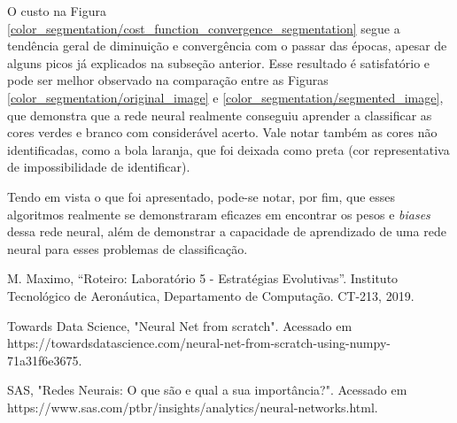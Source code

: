 \documentclass[conference]{IEEEtran}
\begin{document}
O custo na Figura \ref{color_segmentation/cost_function_convergence_segmentation} segue a tendência geral de diminuição e convergência com o passar das épocas, apesar de alguns picos já explicados na subseção anterior. Esse resultado é satisfatório e pode ser melhor observado na comparação entre as Figuras \ref{color_segmentation/original_image} e \ref{color_segmentation/segmented_image}, que demonstra que a rede neural realmente conseguiu aprender a classificar as cores verdes e branco com considerável acerto. Vale notar também as cores não identificadas, como a bola laranja, que foi deixada como preta (cor representativa de impossibilidade de identificar).

Tendo em vista o que foi apresentado, pode-se notar, por fim, que esses algoritmos realmente se demonstraram eficazes em encontrar os pesos e \textit{biases} dessa rede neural, além de demonstrar a capacidade de aprendizado de uma rede neural para esses problemas de classificação.

\begin{thebibliography}{00}
 M. Maximo, ``Roteiro: Laboratório 5 - Estratégias Evolutivas''. Instituto Tecnológico de Aeronáutica, Departamento de Computação. CT-213, 2019.

 Towards Data Science, "Neural Net from scratch". Acessado em https://towardsdatascience.com/neural-net-from-scratch-using-numpy-71a31f6e3675.

 SAS, "Redes Neurais: O que são e qual a sua importância?". Acessado em https://www.sas.com/pt\underline{\space}br/insights/analytics/neural-networks.html.

\end{thebibliography}
\end{document}
